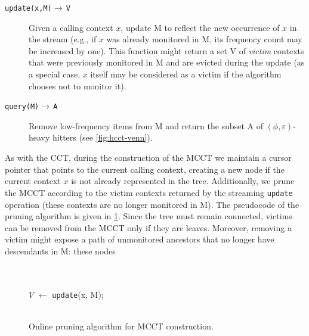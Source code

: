 \begin{description}
\item[{\tt update(x,M)}$\rightarrow\,${\tt V}] Given a calling context $x$, update M to reflect the new occurrence of $x$ in the stream (e.g., if $x$ was already monitored in M, its frequency count may be increased by one). This function might return a set V of {\em victim} contexts that were previously monitored in M and are evicted during the update (as a special case, $x$ itself may be considered as a victim if the algorithm chooses not to monitor it).
\item[{\tt query(M)}$\rightarrow\,${\tt A}] Remove low-frequency items from M and return the subset A of $(\phi,\varepsilon)$-heavy hitters (see \myfigure\ref{fig:hcct-venn}).
\end{description}

\ifauthorea{}{\par\begingroup \parfillskip 0pt \relax}
\noindent As with the CCT, during the construction of the MCCT we maintain a cursor pointer that points to the current calling context, creating a new node if the current context $x$ is not already represented in the tree. Additionally, we prune the MCCT according to the victim contexts returned by the streaming {\tt update} operation (these contexts are no longer monitored in M). The pseudocode of the pruning algorithm is given in \myalgorithm\ref{alg:hcct-update}. Since the tree must remain connected, victims can be removed from
the MCCT only if they are leaves. Moreover, removing a victim might expose a path of unmonitored ancestors that no longer have descendants in M: these nodes 
\ifauthorea{}{\par\endgroup}
\ifdefined\noauthorea

\begin{figure}[h!]
\IncMargin{2em}
\begin{algorithm}[H]
\LinesNumbered
\SetAlgoNoLine
\SetNlSkip{1.5em} 
\Indm\Indmm
\nonl\hrulefill\\
\vspace{-2mm}\hrulefill\\
\Indp\Indpp
$V$ $\gets$ {\tt update}(x, M);\\
\vspace{-2mm}
\Indm\Indmm
\nonl\hrulefill\vspace{1mm}\\
\DecMargin{2em}
\caption{\label{alg:hcct-update} Online pruning algorithm for MCCT construction.}
\end{algorithm}
\end{figure}


